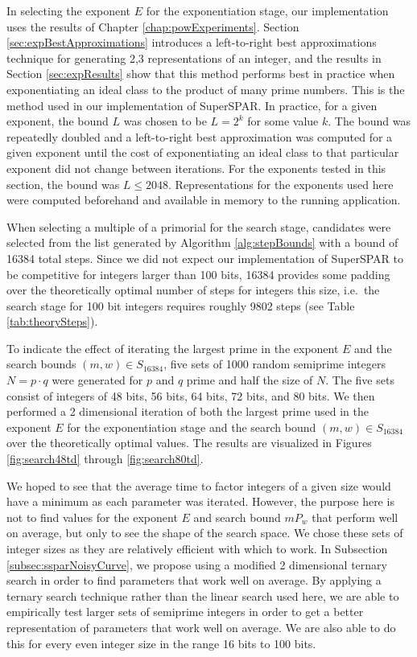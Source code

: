 \documentclass{ucalgthes1}
\theoremstyle{definition}
\begin{document}
In selecting the exponent $E$ for the exponentiation stage, our implementation uses the results of Chapter \ref{chap:powExperiments}.  Section \ref{sec:expBestApproximations} introduces a left-to-right best approximations technique for generating 2,3 representations of an integer, and the results in Section \ref{sec:expResults} show that this method performs best in practice when exponentiating an ideal class to the product of many prime numbers.  This is the method used in our implementation of SuperSPAR.  In practice, for a given exponent, the bound $L$ was chosen to be $L=2^k$ for some value $k$.  The bound was repeatedly doubled and a left-to-right best approximation was computed for a given exponent until the cost of exponentiating an ideal class to that particular exponent did not change between iterations.  For the exponents tested in this section, the bound was $L \le 2048$.  Representations for the exponents used here were computed beforehand and available in memory to the running application.

When selecting a multiple of a primorial for the search stage, candidates were selected from the list generated by Algorithm \ref{alg:stepBounds} with a bound of 16384 total steps.  Since we did not expect our implementation of SuperSPAR to be competitive for integers larger than 100 bits, 16384 provides some padding over the theoretically optimal number of steps for integers this size, i.e.\ the search stage for 100 bit integers requires roughly 9802 steps (see Table \ref{tab:theorySteps}).

To indicate the effect of iterating the largest prime in the exponent $E$ and the search bounds $(m, w) \in S_{16384}$, five sets of 1000 random semiprime integers $N = p \cdot q$ were generated for $p$ and $q$ prime and half the size of $N$.  The five sets consist of integers of 48 bits, 56 bits, 64 bits, 72 bits, and 80 bits.  We then performed a 2 dimensional iteration of both the largest prime used in the exponent $E$ for the exponentiation stage and the search bound $(m, w) \in S_{16384}$ over the theoretically optimal values.  The results are visualized in Figures \ref{fig:search48td} through \ref{fig:search80td}.

We hoped to see that the average time to factor integers of a given size would have a minimum as each parameter was iterated.  However, the purpose here is not to find values for the exponent $E$ and search bound $mP_w$ that perform well on average, but only to see the shape of the search space.  We chose these sets of integer sizes as they are relatively efficient with which to work.  In Subsection \ref{subsec:ssparNoisyCurve}, we propose using a modified 2 dimensional ternary search in order to find parameters that work well on average.  By applying a ternary search technique rather than the linear search used here, we are able to empirically test larger sets of semiprime integers in order to get a better representation of parameters that work well on average.  We are also able to do this for every even integer size in the range 16 bits to 100 bits.
\end{document}
